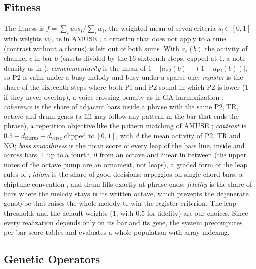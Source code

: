 \documentclass{article}
\begin{document}
\subsection{Fitness}

The fitness is $f = \sum_i w_i s_i / \sum_i w_i$, the weighted mean of seven criteria
$s_i \in [0, 1]$ with weights $w_i$, as in AMUSE \cite{ozcan2008genetic}; a criterion that does
not apply to a tune (contrast without a chorus) is left out of both sums. With $a_c(b)$ the activity of channel $c$ in bar $b$ (onsets divided by the
16 sixteenth steps, capped at 1, a note density as in \cite{towsey2001towards}):
\emph{complementarity} is the mean of $1 - |a_{\mathrm{P2}}(b) - (1 - a_{\mathrm{P1}}(b))|$, so P2
is calm under a busy melody and busy under a sparse one; \emph{register} is the share of the
sixteenth steps where both P1 and P2 sound in which P2 is lower (1 if they never overlap), a voice-crossing penalty as in GA
harmonization \cite{phonamnuaisuk1999evolving}; \emph{coherence} is the share of adjacent bars inside
a phrase with the same P2, TR, octave and drum genes (a fill may follow any pattern in the bar that
ends the phrase), a repetition objective like the pattern matching of AMUSE \cite{ozcan2008genetic};
\emph{contrast} is $0.5 + \bar{d}_{\mathrm{chorus}} - \bar{d}_{\mathrm{verse}}$ clipped to $[0, 1]$,
with $d$ the mean activity of P2, TR and NO; \emph{bass smoothness} is the mean score of every leap
of the bass line, inside and across bars, 1 up to a fourth, 0 from an octave and linear in between (the upper notes of
the octave pump are an ornament, not leaps), a graded form of the leap rules of
\cite{phonamnuaisuk1999evolving,ozcan2008genetic}; \emph{idiom} is the share of good decisions:
arpeggios on single-chord bars, a chiptune convention \cite{driscoll2009endless}, and drum fills
exactly at phrase ends; \emph{fidelity} is the share of bars where the melody stays in its written
octave, which prevents the degenerate genotype that raises the whole melody to win the register
criterion. The leap thresholds and the default weights (1, with 0.5 for fidelity) are our choices.
Since every realization depends only on its bar and its gene, the system precomputes per-bar score
tables and evaluates a whole population with array indexing.

\subsection{Genetic Operators}
\end{document}
